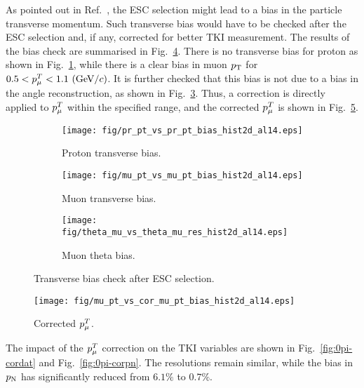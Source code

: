         As pointed out in Ref.~\cite{Lu:2016mjf}, the ESC selection might lead to a bias in the particle transverse momentum. 
        Such transverse bias would have to be checked after the ESC selection and, if any, corrected for better TKI measurement. 
        The results of the bias check are summarised in Fig.~\ref{fig:0piptbiascheck}. 
        There is no transverse bias for proton as shown in Fig.~\ref{fig:0pi-prpt-bias}, while there is a clear bias in muon $p_\textrm{T}$ for $0.5<p_{\mu}^T<1.1~(\textrm{GeV}/c)$. 
        It is further checked that this bias is not due to a bias in the angle reconstruction, as shown in Fig.~\ref{fig:0pi-mutheta-bias}.
        Thus, a correction is directly applied to $p_{\mu}^T$ within the specified range, and the corrected $p_{\mu}^T$ is shown in Fig.~\ref{fig:cormupt}.

       \begin{figure}[!htb]
           \centering
           \begin{subfigure}{0.3\textwidth}
                \texttt{[image: fig/pr\_pt\_vs\_pr\_pt\_bias\_hist2d\_al14.eps]}
                \caption{Proton transverse bias.}
                \label{fig:0pi-prpt-bias}
           \end{subfigure}
           \begin{subfigure}{0.3\textwidth}
                \texttt{[image: fig/mu\_pt\_vs\_mu\_pt\_bias\_hist2d\_al14.eps]}
                \caption{Muon transverse bias.}
                \label{fig:0pi-mupt-bias}
           \end{subfigure}
           \begin{subfigure}{0.3\textwidth}
                \texttt{[image: fig/theta\_mu\_vs\_theta\_mu\_res\_hist2d\_al14.eps]}
                \caption{Muon theta bias.}
                \label{fig:0pi-mutheta-bias}
           \end{subfigure}
           \caption{Transverse bias check after ESC selection.}
           \label{fig:0piptbiascheck}
        \end{figure}
            
        \begin{figure}[!htb] 	
            \centering 		
            \texttt{[image: fig/mu\_pt\_vs\_cor\_mu\_pt\_bias\_hist2d\_al14.eps]}
            \caption{\label{fig:cormupt} Corrected $p_{\mu}^T$.} 
        \end{figure}

        The impact of the $p_{\mu}^T$ correction on the TKI variables are shown in Fig.~\ref{fig:0pi-cordat} and Fig.~\ref{fig:0pi-corpn}. The resolutions remain similar, while the bias in $p_\textrm{N}$ has significantly reduced from $6.1\%$ to $0.7\%$.

